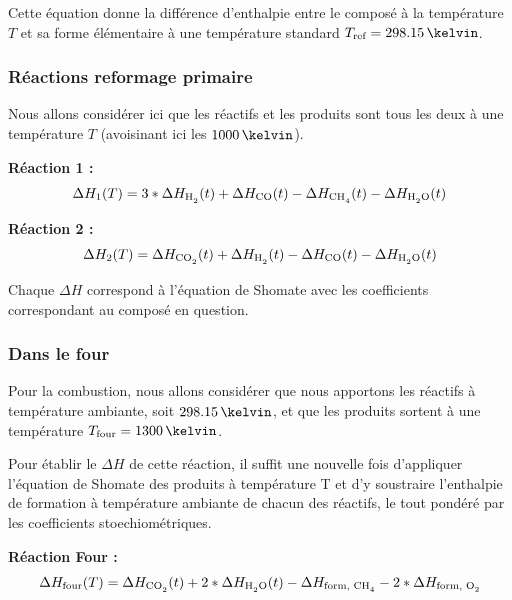 \documentclass[a4paper,12pt]{article}
\begin{document}
Cette équation donne la différence d'enthalpie entre le composé à la température $T$
et sa forme élémentaire à une température standard $T\ind{ref} = 298.15\,\kelvin$.


\subsubsection{Réactions reformage primaire}

Nous allons considérer ici que les réactifs et les produits sont tous les deux
à une température $T$ (avoisinant ici les $1000\,\kelvin$).


\textbf{Réaction 1 :}  
\begin{equation*}
    \Delta H_1 (T) = 3*\Delta H_{\ce{H2}} (t)
    + \Delta H_{\ce{CO}} (t)
    - \Delta H_{\ce{CH4}} (t)
    - \Delta H_{\ce{H2O}} (t) 
\end{equation*}

\textbf{Réaction 2 :}  
\begin{equation*}
    \Delta H_2 (T) = \Delta H_{\ce{CO2}} (t)
    + \Delta H_{\ce{H2}} (t)
    - \Delta H_{\ce{CO}} (t)
    - \Delta H_{\ce{H2O}} (t) 
\end{equation*}

Chaque $\Delta H$ correspond à l’équation de Shomate
avec les coefficients correspondant au composé en question.


\subsubsection{Dans le four}

Pour la combustion, nous allons considérer que nous apportons les réactifs
à température ambiante, soit $298.15\,\kelvin$,
et que les produits sortent à une température $T\ind{four}=1300\,\kelvin$.

Pour établir le $\Delta H$ de cette réaction,
il suffit une nouvelle fois d’appliquer l’équation de Shomate des produits à température T
et d’y soustraire l’enthalpie de formation à température ambiante de chacun des réactifs,
le tout pondéré par les coefficients stoechiométriques.


\textbf{Réaction Four :}  
\begin{equation*}
    \Delta H\ind{four}(T) =  \Delta H_{\ce{CO2}} (t)
    + 2*\Delta H_{\ce{H2O}} (t)
    - \Delta H\ind{form, \ce{CH4}}
    - 2*\Delta H\ind{form, \ce{O2}}
\end{equation*}
\end{document}
